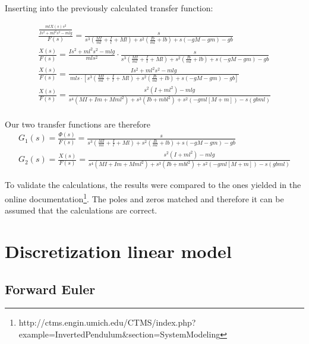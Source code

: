 Inserting into the previously calculated transfer function:

\begin{eqnarray}
	\frac{\frac{mlX\left(s\right)s^2}{Is^2+ml^2s^2-mlg}}{F\left(s\right)}=\frac{s}{s^3\left(\frac{MI}{ml}+\frac{I}{l}+Ml\right)+s^2\left(\frac{Ib}{ml}+lb\right)+s(-gM-gm)-gb}
	\\
	\frac{X\left(s\right)}{F\left(s\right)}=\frac{Is^2+ml^2s^2-mlg}{mls^2}\cdot\frac{s}{s^3\left(\frac{MI}{ml}+\frac{I}{l}+Ml\right)+s^2\left(\frac{Ib}{ml}+lb\right)+s(-gM-gm)-gb}
	\\
	\frac{X\left(s\right)}{F\left(s\right)}=\frac{Is^2+ml^2s^2-mlg}{\ mls\cdot\left[s^3\left(\frac{MI}{ml}+\frac{I}{l}+Ml\right)+s^2\left(\frac{Ib}{ml}+lb\right)+s\left(-gM-gm\right)-gb\right]}
	\\
	\frac{X\left(s\right)}{F\left(s\right)}=\frac{s^2\left(I+ml^2\right)-mlg}{s^4\left(MI+Im+Mml^2\right)+s^3\left(Ib+m{bl}^2\right)+s^2\left(-gml\left[M+m\right]\right)-s\left(gbml\right)}
	\\
\end{eqnarray}

Our two transfer functions are therefore
\begin{eqnarray}
	G_1\left(s\right)=\frac{\Phi\left(s\right)}{F\left(s\right)}=\frac{s}{s^3\left(\frac{MI}{ml}+\frac{I}{l}+Ml\right)+s^2\left(\frac{Ib}{ml}+lb\right)+s(-gM-gm)-gb}
	\\
	G_2\left(s\right)=\frac{X\left(s\right)}{F\left(s\right)}=\frac{s^2\left(I+ml^2\right)-mlg}{s^4\left(MI+Im+Mml^2\right)+s^3\left(Ib+m{bl}^2\right)+s^2\left(-gml\left[M+m\right]\right)-s\left(gbml\right)}
\end{eqnarray}

To validate the calculations, the results were compared to the ones yielded in the online documentation\footnote{http://ctms.engin.umich.edu/CTMS/index.php?example=InvertedPendulum\&section=SystemModeling}.  The poles and zeros matched and therefore it can be assumed that the calculations are correct.

\section{Discretization linear model}

	\subsection{Forward Euler}
	
